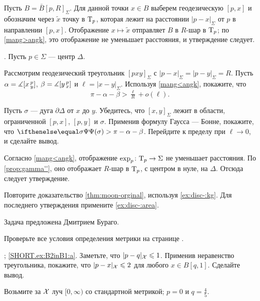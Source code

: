 Пусть $B=\bar B[p,R]_\Sigma$.
Для данной точки $x\in B$ выберем геодезическую $[p,x]$ и обозначим через $\tilde x$ точку в $\mathrm{T}_p$, которая лежит на расстоянии $|p-x|_\Sigma$ от $p$ в направлении $[p,x]$.
Отображение $x\mapsto \tilde x$ отправляет $B$ в $R$-шар в $\mathrm{T}_p$;
по \mbox{\ref{mang>angk}}, это отображение не уменьшает расстояния,
и утверждение следует.

\parbf{\ref{ex:disc-}}.
Пусть $p\in\Sigma$ --- центр $\Delta$. 

Рассмотрим геодезический треугольник $[pxy]_\Sigma$ с $|p-x|_\Sigma=|p-y|_\Sigma=R$.
Пусть $\alpha=\measuredangle[x\,{}^{p}_{y}]$, 
$\beta=\measuredangle[y\,{}^{p}_{x}]$ и $\ell=|x-y|_\Sigma$.
Используя \mbox{\ref{mang<angk}}, покажите, что 
\[\pi-\alpha-\beta>\tfrac\ell R+o(\ell).\]

Пусть $\sigma$ --- дуга $\partial \Delta$ от $x$ до $y$.
Убедитесь, что $[x,y]_\Sigma$ лежит в области, ограниченной $[p,x]$, $[p,y]$ и $\sigma$.
Применив формулу Гаусса --- Бонне, покажите, что $\tgc\sigma\z>\pi-\alpha-\beta$.
Перейдите к пределу при $\ell\to0$, и сделайте вывод.

Согласно \ref{mang<angk}, отображение $\exp_p\:\T_p\z\to\Sigma$ не уменьшает расстояния.
По \ref{prop:gamma''},  оно отображает $R$-шар в $\mathrm{T}_p$, с центром в нуле, на $\Delta$.
Отсюда следует утверждение.

Повторите доказательство \ref{thm:moon-orginal}, используя \ref{ex:disc-:kg}.
Для последнего утверждения примените \ref{ex:disc-:area}.

Задача предложена Дмитрием Бураго.


\setcounter{eqtn}{0}

Проверьте все условия определения метрики на странице \pageref{page:def:metric}.

\parbf{\ref{ex:B2inB1}}; \ref{SHORT.ex:B2inB1:a}.
Заметьте, что $\dist{p}{q}{\spc{X}}\le 1$.
Применив неравенство треугольника, покажите, что $\dist{p}{x}{\spc{X}}\le 2$ для любого $x\in B[q,1]$.
Сделайте вывод.

Возьмите за $\mathcal{X}$ луч $[0,\infty)$ со стандартной метрикой; $p=0$ и $q=\tfrac45$.


